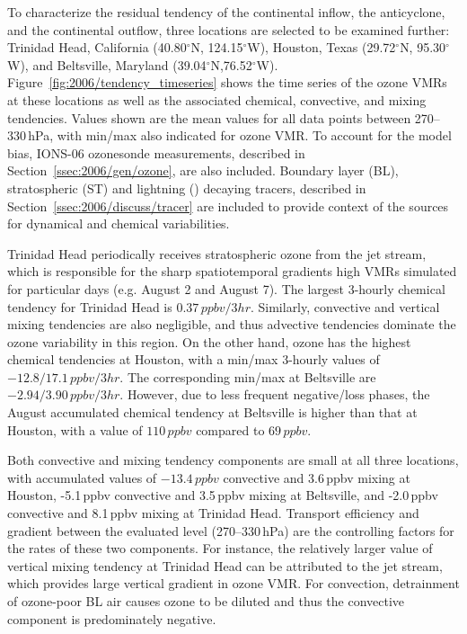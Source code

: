 To characterize the residual tendency of the continental inflow, the anticyclone, and the continental outflow, three locations are selected to be
examined further: Trinidad Head, California (40.80$^\circ$N, 124.15$^\circ$W), Houston, Texas (29.72$^\circ$N, 95.30$^\circ$W),
and Beltsville, Maryland (39.04$^\circ$N,76.52$^\circ$W). Figure~\ref{fig:2006/tendency_timeseries} shows the time series of the
ozone VMRs at these locations as well as the associated chemical, convective, and mixing tendencies. Values shown are the mean values for
all data points between 270--330\,\unit{hPa}, with min/max also indicated for ozone VMR.
To account for the model bias, IONS-06 ozonesonde measurements, described in Section~\ref{ssec:2006/gen/ozone}, are also included.
Boundary layer (BL), stratospheric (ST) and lightning (\lnox) decaying tracers, described in Section~\ref{ssec:2006/discuss/tracer}
are included to provide context of the sources for dynamical and chemical variabilities.

Trinidad Head periodically receives stratospheric ozone from the jet stream, which is responsible for the sharp spatiotemporal gradients
high VMRs simulated for particular days (e.g. August 2 and August 7). The largest 3-hourly chemical tendency for Trinidad Head is
$0.37\,\unit{ppbv/3 hr}$. Similarly, convective and vertical mixing tendencies are also negligible, and thus advective tendencies dominate
the ozone variability in this region. On the other hand, ozone has the highest chemical tendencies at Houston, with a min/max 3-hourly values of
$-12.8/17.1\,\unit{ppbv/3 hr}$. The corresponding min/max at Beltsville are $-2.94/3.90\,\unit{ppbv/3 hr}$. However, due to less frequent
negative/loss phases, the August accumulated chemical tendency at Beltsville is higher than that at Houston, with a value of $110\,\unit{ppbv}$
compared to $69\,\unit{ppbv}$. 

Both convective and mixing tendency components are small at all three locations, with accumulated values of $-13.4\,\unit{ppbv}$ convective
and 3.6\,\unit{ppbv} mixing at Houston, -5.1\,\unit{ppbv} convective and 3.5\,\unit{ppbv} mixing at Beltsville, and -2.0\,\unit{ppbv} convective and
8.1\,\unit{ppbv} mixing at Trinidad Head. Transport efficiency and gradient between the evaluated level (270--330\,\unit{hPa}) are the controlling
factors for the rates of these two components. For instance, the relatively larger value of vertical mixing tendency at Trinidad Head can be
attributed to the jet stream, which provides large vertical gradient in ozone VMR. For convection, detrainment of ozone-poor BL
air causes ozone to be diluted and thus the convective component is predominately negative.

